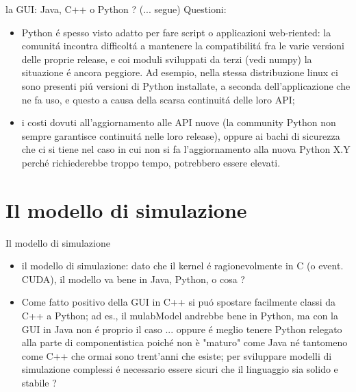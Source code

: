 \documentclass{beamer}
\begin{document}
\begin{frame}{la GUI: Java, C++ o Python ?}
(... segue) Questioni:
\begin{itemize}
\item Python \'e spesso visto adatto per fare script o applicazioni web-riented: la comunit\'a incontra difficolt\'a a mantenere
la compatibilit\'a fra le varie versioni delle proprie release, e coi moduli sviluppati da terzi (vedi numpy) la situazione \'e
ancora peggiore. Ad esempio, nella stessa distribuzione linux ci sono presenti pi\'u versioni di Python installate, a seconda
dell'applicazione che ne fa uso, e questo a causa della scarsa continuit\'a delle loro API;
\item i costi dovuti all'aggiornamento alle API nuove (la community Python non sempre garantisce continuit\'a nelle loro release),
oppure ai bachi di sicurezza che ci si tiene nel caso in cui non si fa l'aggiornamento alla nuova Python X.Y perch\'e richiederebbe
troppo tempo, potrebbero essere elevati.
\end{itemize}

\end{frame}



\section{Il modello di simulazione}
\begin{frame}{Il modello di simulazione}
\begin{itemize}
\item il modello di simulazione: dato che il kernel \'e ragionevolmente in C (o event. CUDA), il modello va bene in Java, Python, o cosa ?
\item Come fatto positivo della GUI in C++ si pu\'o spostare facilmente classi da C++ a Python; ad es., il mulabModel andrebbe bene
in Python, ma con la GUI in Java non \'e proprio il caso ... oppure \'e meglio tenere Python relegato alla parte di componentistica poich\'e
non è "maturo" come Java n\'e tantomeno come C++ che ormai sono trent'anni che esiste; per sviluppare modelli di simulazione complessi \'e
necessario essere sicuri che il linguaggio sia solido e stabile ?
\end{itemize}

\end{frame}
\end{document}
